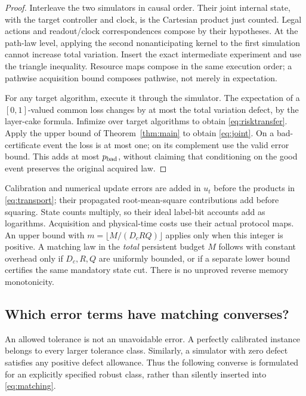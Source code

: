 \begin{proof}
Interleave the two simulators in causal order. Their joint internal state, with the target controller and clock, is the Cartesian product just counted. Legal actions and readout/clock correspondences compose by their hypotheses. At the path-law level, applying the second nonanticipating kernel to the first simulation cannot increase total variation. Insert the exact intermediate experiment and use the triangle inequality. Resource maps compose in the same execution order; a pathwise acquisition bound composes pathwise, not merely in expectation.

For any target algorithm, execute it through the simulator. The expectation of a $[0,1]$-valued common loss changes by at most the total variation defect, by the layer-cake formula. Infimize over target algorithms to obtain \eqref{eq:risktransfer}. Apply the upper bound of Theorem~\ref{thm:main} to obtain \eqref{eq:joint}. On a bad-certificate event the loss is at most one; on its complement use the valid error bound. This adds at most $p_{\rm bad}$, without claiming that conditioning on the good event preserves the original acquired law.
\end{proof}

Calibration and numerical update errors are added in $u_t$ before the products in \eqref{eq:transport}; their propagated root-mean-square contributions add before squaring. State counts multiply, so their ideal label-bit accounts add as logarithms. Acquisition and physical-time costs use their actual protocol maps. An upper bound with $m=\lfloor M/(D_cRQ)\rfloor$ applies only when this integer is positive. A matching law in the \emph{total} persistent budget $M$ follows with constant overhead only if $D_c,R,Q$ are uniformly bounded, or if a separate lower bound certifies the same mandatory state cut. There is no unproved reverse memory monotonicity.

\subsection{Which error terms have matching converses?}
An allowed tolerance is not an unavoidable error. A perfectly calibrated instance belongs to every larger tolerance class. Similarly, a simulator with zero defect satisfies any positive defect allowance. Thus the following converse is formulated for an explicitly specified robust class, rather than silently inserted into \eqref{eq:matching}.

